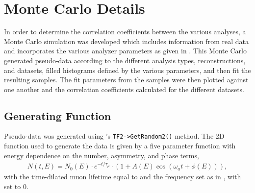 
\graphicspath{{Body/Figures/EvW/}{Body/Figures/GoodnessOfFit/}{Body/Figures/Correlations/}}

\section{Monte Carlo Details}


In order to determine the correlation coefficients between the various analyses, a Monte Carlo simulation was developed which includes information from real data and incorporates the various analyzer parameters as given in . This Monte Carlo generated pseudo-data according to the different analysis types, reconstructions, and datasets, filled histograms defined by the various parameters, and then fit the resulting samples. The fit parameters from the samples were then plotted against one another and the correlation coefficients calculated for the different datasets.


\subsection{Generating Function}

Pseudo-data was generated using \ROOT's \texttt{TF2->GetRandom2()} method. The 2D function used to generate the data is given by a five parameter function with energy dependence on the number, asymmetry, and phase terms,
\begin{align}
    N(t, E) = N_{0}(E) \cdot e^{-t/\tau_{\mu}} \cdot (1 + A(E) \cos{(\omega_{a}t + \phi(E))}),
\label{eq:2dfunc}
\end{align}
with the time-dilated muon lifetime \taumu equal to  and the \gmtwo frequency \wa set as in , with \R set to 0. 


